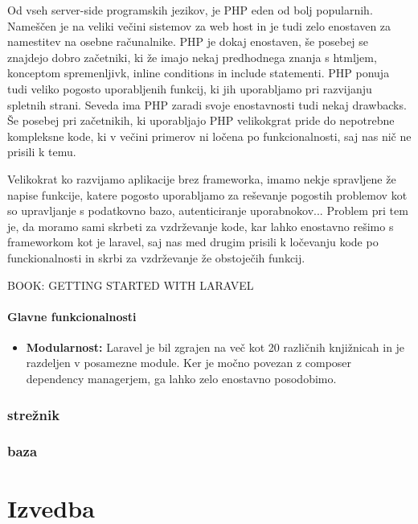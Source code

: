\documentclass[12pt,a4paper,titlepage,openany]{report}
\begin{document}
Od vseh server-side programskih jezikov, je PHP eden od bolj popularnih. Nameščen je na veliki večini sistemov za web host in je tudi zelo enostaven za namestitev na osebne računalnike. PHP je dokaj enostaven, še posebej se znajdejo dobro začetniki, ki že imajo nekaj predhodnega znanja s htmljem, konceptom spremenljivk, inline conditions in include statementi. PHP ponuja tudi veliko pogosto uporabljenih funkcij, ki jih uporabljamo pri razvijanju spletnih strani. Seveda ima PHP zaradi svoje enostavnosti tudi nekaj drawbacks. Še posebej pri začetnikih, ki uporabljajo PHP velikokgrat pride do nepotrebne kompleksne kode, ki v večini primerov ni ločena po funkcionalnosti, saj nas nič ne prisili k temu. 

Velikokrat ko razvijamo aplikacije brez frameworka, imamo nekje spravljene že napise funkcije, katere pogosto uporabljamo za reševanje pogostih problemov kot so upravljanje s podatkovno bazo, autenticiranje uporabnokov... Problem pri tem je, da moramo sami skrbeti za vzdrževanje kode, kar lahko enostavno rešimo s frameworkom kot je laravel, saj nas med drugim prisili k ločevanju kode po funckionalnosti in skrbi za vzdrževanje že obstoječih funkcij.

BOOK: GETTING STARTED WITH LARAVEL

\subsubsection{Glavne funkcionalnosti}

\begin{itemize}
\item \textbf{Modularnost:} Laravel je bil zgrajen na več kot 20 različnih knjižnicah in je razdeljen v posamezne module. Ker je močno povezan z composer dependency managerjem, ga lahko zelo enostavno posodobimo.
\end{itemize}


\subsection{strežnik}

\subsection{baza}

\chapter{Izvedba}
\thispagestyle{fancy}
\end{document}
